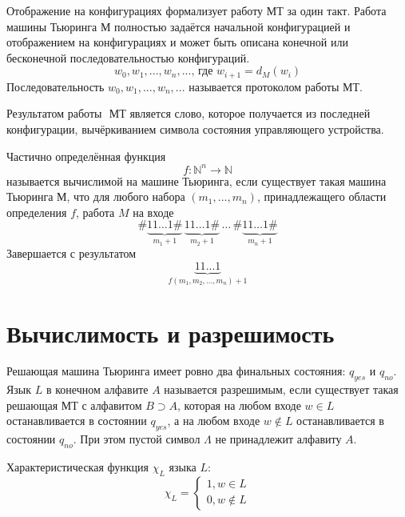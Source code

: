 \documentclass[11pt]{article}
\begin{document}
\begin{definition}
    Отображение на конфигурациях формализует работу МТ за один такт. Работа машины Тьюринга М
    полностью задаётся начальной конфигурацией и отображением на конфигурациях и может быть описана конечной или бесконечной последовательностью конфигураций.
    \[ w_0, w_1,..., w_n, ... \text{, где } w_{i+1}=d_M(w_i) \]
    Последовательность $w_0, w_1, ..., w_n, ...$ называется $\textbf{протоколом работы}$ МТ.
\end{definition}

\begin{definition}
    $\textbf{Результатом работы }$ МТ является слово, которое получается из последней конфигурации, вычёркиванием символа состояния управляющего устройства. 
\end{definition}

\begin{definition}
    Частично определённая функция 
    \[ f: \mathbb{N}^n \to \mathbb{N} \]
    называется вычислимой на машине Тьюринга, если существует такая машина Тьюринга М, что для любого набора $(m_1,...,m_n)$, принадлежащего области определения $f$, 
    работа $M$ на входе 
    \[ \#\underbrace{11\ldots1\#}_{m_1+1}\,
    \underbrace{11\ldots1\#}_{m_2+1}\,\ldots\,
    \#\underbrace{11\ldots1\#}_{m_n+1} \]
    Завершается с результатом
    \[ \underbrace{11...1}_{f(m_1,m_2,...,m_n)+1} \]
\end{definition}

\section{Вычислимость и разрешимость}
\begin{definition}
    $\textbf{Решающая}$ машина Тьюринга имеет ровно два финальных состояния: $q_{yes}$ и $q_{no}$.\\
    Язык $L$ в конечном алфавите $A$ называется $\textbf{разрешимым}$, если существует такая решающая МТ с алфавитом $B\supset A$, которая на любом входе $w\in L$ останавливается в состоянии $q_{yes}$, а на любом входе $w\notin L$ останавливается в состоянии $q_{no}$. 
    При этом пустой символ $\Lambda$ не принадлежит алфавиту $A$.
\end{definition}


\begin{definition}
    Характеристическая функция $ \chi_L$ языка $L$:
    \[ \chi_L = 
    \begin{cases}
        1, w\in L\\
        0, w\notin L
    \end{cases} \]
\end{definition}
\end{document}
